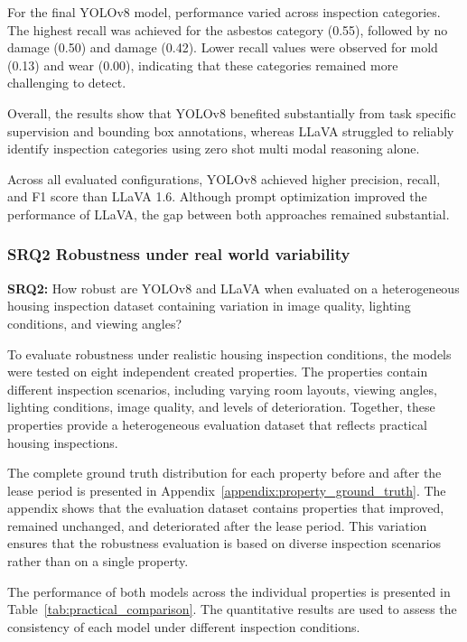 For the final YOLOv8 model, performance varied across inspection categories. The highest recall was achieved for the asbestos category (0.55), followed by no damage (0.50) and damage (0.42). Lower recall values were observed for mold (0.13) and wear (0.00), indicating that these categories remained more challenging to detect.

Overall, the results show that YOLOv8 benefited substantially from task specific supervision and bounding box annotations, whereas LLaVA struggled to reliably identify inspection categories using zero shot multi modal reasoning alone.

Across all evaluated configurations, YOLOv8 achieved higher precision, recall, and F1 score than LLaVA 1.6. Although prompt optimization improved the performance of LLaVA, the gap between both approaches remained substantial.


\subsubsection{SRQ2 Robustness under real world variability}

\textbf{SRQ2:} How robust are YOLOv8 and LLaVA when evaluated on a heterogeneous housing inspection dataset containing variation in image quality, lighting conditions, and viewing angles?

To evaluate robustness under realistic housing inspection conditions, the models were tested on eight independent created properties. The properties contain different inspection scenarios, including varying room layouts, viewing angles, lighting conditions, image quality, and levels of deterioration. Together, these properties provide a heterogeneous evaluation dataset that reflects practical housing inspections.

The complete ground truth distribution for each property before and after the lease period is presented in Appendix~\ref{appendix:property_ground_truth}. The appendix shows that the evaluation dataset contains properties that improved, remained unchanged, and deteriorated after the lease period. This variation ensures that the robustness evaluation is based on diverse inspection scenarios rather than on a single property.

The performance of both models across the individual properties is presented in Table~\ref{tab:practical_comparison}. The quantitative results are used to assess the consistency of each model under different inspection conditions.

